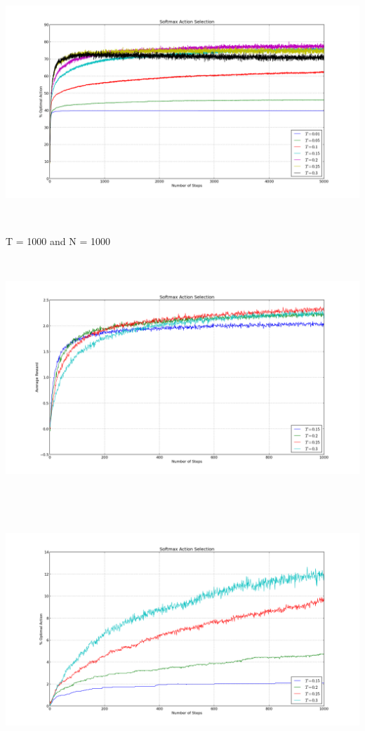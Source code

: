 \documentclass[a4paper,10pt]{report}
\newenvironment{my_itemize}{
\begin{itemize}
  \setlength{\itemsep}{1pt}
  \setlength{\parskip}{0pt}
  \setlength{\parsep}{0pt}}{
\end{itemize}}
\begin{document}
\begin{my_itemize}
\begin{center}
\end{center}
\begin{center}
\centerline{\includegraphics*[width=180mm, height=90mm]{SoftOpt-10-5000.png}}
\end{center}
\pagebreak
\item T = 1000 and N = 1000
\begin{center}
\centerline{\includegraphics*[width=180mm, height=90mm]{SoftRew-1000-1000.png}}
\end{center}
\begin{center}
\centerline{\includegraphics*[width=180mm, height=90mm]{SoftOpt-1000-1000.png}}
\end{center}
\end{my_itemize}
\pagebreak
\end{document}
